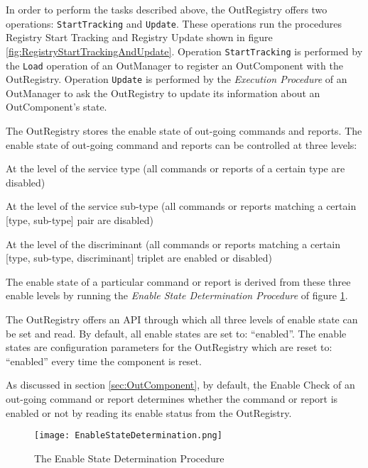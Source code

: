 In order to perform the tasks described above, the OutRegistry offers two operations: \texttt{StartTracking} and \texttt{Update}. These operations run the procedures Registry Start Tracking and Registry Update shown in figure \ref{fig:RegistryStartTrackingAndUpdate}. Operation \texttt{StartTracking} is performed by the \texttt{Load} operation of an OutManager to register an OutComponent with the OutRegistry. Operation \texttt{Update} is performed by the \textit{Execution Procedure} of an OutManager to ask the OutRegistry to update its information about an OutComponent's state.

The OutRegistry stores the enable state of out-going commands and reports. The enable state of out-going command and reports can be controlled at three levels: 
\begin{fw_itemize}
\item[(a)] At the level of the service type (all commands or reports of a certain type are disabled)
\item[(b)] At the level of the service sub-type (all commands or reports matching a certain [type, sub-type] pair are disabled)
\item[(c)] At the level of the discriminant (all commands or reports matching a certain [type, sub-type, discriminant] triplet are enabled or disabled)
\end{fw_itemize}
The enable state of a particular command or report is derived from these three enable levels by running the \textit{Enable State Determination Procedure} of figure \ref{fig:EnableStateDetermination}.

The OutRegistry offers an API through which all three levels of enable state can be set and read. By default, all enable states are set to: “enabled”. The enable states are configuration parameters for the OutRegistry which are reset to: “enabled” every time the component is reset.

As discussed in section \ref{sec:OutComponent}, by default, the Enable Check of an out-going command or report determines whether the command or report is enabled or not by reading its enable status from the OutRegistry. 

\begin{figure}[H]
 \centering
 \texttt{[image: EnableStateDetermination.png]}
 \caption{The Enable State Determination Procedure}
 \label{fig:EnableStateDetermination}
\end{figure}

